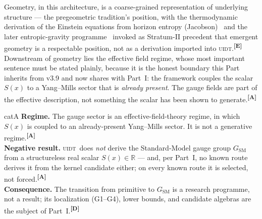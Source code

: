 \documentclass[12pt,a4paper,twoside]{article}
\theoremstyle{plain}
\theoremstyle{definition}
\theoremstyle{remark}
\newcommand{\UIDT}{\textsc{uidt}} %
\newcommand{\catmark}[1]{\textsuperscript{\textsf{\textbf{[#1]}}}}
\begin{document}
Geometry, in this architecture, is a coarse-grained representation of
underlying structure --- the pregeometric tradition's position, with the
thermodynamic derivation of the Einstein equations from horizon entropy
(Jacobson)~\cite{jacobson1995} and the later entropic-gravity programme~\cite{padmanabhan2010,verlinde2011,chirco2014} invoked as
Stratum-II precedent that emergent geometry is a respectable position,
not as a derivation imported into \UIDT.\catmark{E} Downstream of
geometry lies the effective field regime, whose most important sentence
must be stated plainly, because it is the honest boundary this Part
inherits from v3.9 and now shares with Part~I: the framework couples the
scalar $S(x)$ to a Yang--Mills sector that is \emph{already present}.
The gauge fields are part of the effective description, not something
the scalar has been shown to generate.\catmark{A}

\begin{evidencebox}{catA}
\textbf{Regime.} The gauge sector is an effective-field-theory regime,
in which $S(x)$ is coupled to an already-present Yang--Mills sector. It
is not a generative regime.\catmark{A}\\[0.3em]
\textbf{Negative result.} \UIDT\ does \emph{not} derive the
Standard-Model gauge group $G_{\mathrm{SM}}$ from a structureless real
scalar $S(x)\in\mathbb{R}$ --- and, per Part~I, no known route derives
it from the kernel candidate either; on every known route it is
selected, not forced.\catmark{A}\\[0.3em]
\textbf{Consequence.} The transition from primitive to
$G_{\mathrm{SM}}$ is a research programme, not a result; its
localization (G1--G4), lower bounds, and candidate algebras are the
subject of Part~I.\catmark{D}
\end{evidencebox}

\newpage

\nocite{*}


\end{document}
